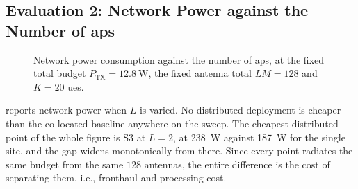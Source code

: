 \subsection{Evaluation 2: Network Power against the Number of \glspl{ap}}
\label{ssec:eval_power_aps}

\begin{figure}[t]
\centering

\caption{Network power consumption against the number of \glspl{ap}, at the
fixed total budget $P_{\mathrm{TX}}=\SI{12.8}{\watt}$, the fixed antenna total
$LM=128$ and $K=20$ \glspl{ue}.}
\label{fig:eval2}
\end{figure}

 reports network power when $L$ is varied. No distributed deployment is
cheaper than the co-located baseline anywhere on the sweep. The cheapest
distributed point of the whole figure is S3 at $L=2$, at \SI{238}{\watt} against
\SI{187}{\watt} for the single site, and the gap widens monotonically from
there. Since every point radiates the same budget from the same $128$ antennas,
the entire difference is the cost of separating them, i.e., fronthaul and processing cost.



